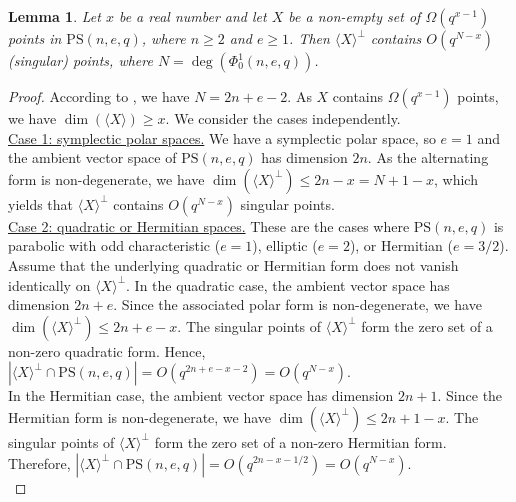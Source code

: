 \documentclass[10pt,a4paper]{amsart}
\newtheorem{lemma}{Lemma}
\newcommand{\PS}{\mathrm{PS}}
\renewcommand{\geq}{\geqslant}
\renewcommand{\leq}{\leqslant}
\begin{document}
\begin{lemma} \label{L: points in X perp}
    Let $x$ be a real number and let $X$ be a non-empty set of $\Omega(q^{x-1})$ points in $\PS(n,e,q)$, where $n\geq 2$ and $e\geq 1$. Then $\langle X \rangle^\perp$ contains $O(q^{N-x})$ (singular) points, where $N= \deg(\Phi_0^1(n,e,q))$. 
\end{lemma}

\begin{proof}
According to , we have $N=2n+e-2$.
As $X$ contains  $\Omega(q^{x-1})$ points, we have $\dim(\langle X\rangle)\geq x$.
   We consider the cases independently.\\

    \underline{Case 1: symplectic polar spaces.} We have a symplectic polar space, so $e=1$ and the ambient vector space of $\PS(n,e,q)$ has dimension $2n$. As the alternating form is non-degenerate, we have $\dim(\langle X \rangle^\perp)\leq 2n-x=N+1-x$, which yields that $\langle X \rangle^\perp$ contains $O(q^{N-x})$ singular points.  \\
    
    \underline{Case 2: quadratic or Hermitian spaces.}
    These are the cases where $\PS(n,e,q)$ is parabolic with odd characteristic ($e=1$), elliptic ($e=2$), or Hermitian ($e=3/2$).\\  
    
    Assume that the underlying quadratic or Hermitian form does not vanish identically on $\langle X \rangle^\perp$.
    In the quadratic case, the ambient vector space has dimension $2n+e$. Since the associated polar form is non-degenerate, we have $\dim(\langle X \rangle^\perp)\leq 2n+e-x$. The singular points of $\langle X \rangle^\perp$ form the zero set of a non-zero quadratic form. Hence, $|\langle X \rangle^\perp \cap\PS(n,e,q)|= O(q^{2n+e-x-2})
    =O(q^{N-x})$.\\
    In the Hermitian case, the ambient vector space has dimension $2n+1$. Since the Hermitian form is non-degenerate, we have $\dim(\langle X \rangle^\perp)\leq 2n+1-x$. The singular points of $\langle X \rangle^\perp$ form the zero set of a non-zero Hermitian form. Therefore, $|\langle X \rangle^\perp\cap\PS(n,e,q)|= O(q^{2n-x-1/2})=O(q^{N-x})$.\\
    

\end{proof}
\end{document}
